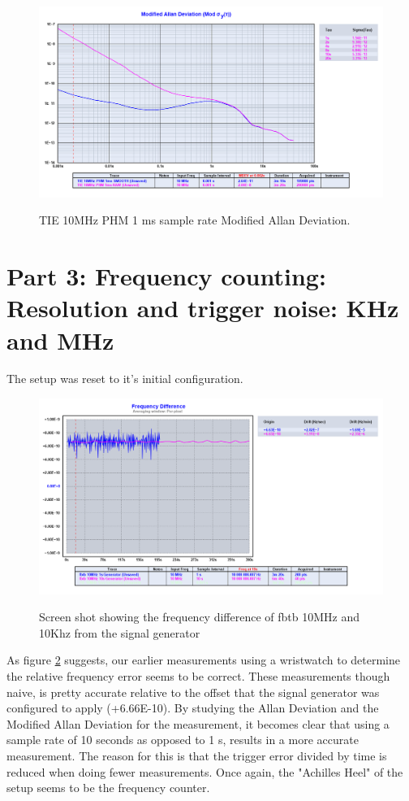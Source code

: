 \documentclass[11pt,english,a4paper]{article}
\begin{document}
\begin{figure}[!htb]
  \caption{TIE 10MHz PHM 1 ms sample rate Modified Allan Deviation.}
  \centering
    \includegraphics[width=1\textwidth]{tie_10mhz_phm_1ms_modified_allan.png}
    \label{fig:PHM_10MHz_mod_allan_dev}
\end{figure}

\newpage
\section{Part 3: Frequency counting: Resolution and trigger noise: KHz and MHz}
The setup was reset to it's initial configuration. 
\begin{figure}[!htb]
  \caption{Screen shot showing the frequency difference of fbtb 10MHz and 10Khz from the signal generator}
  \centering
    \includegraphics[width=1\textwidth]{freq_diff_del3.png}
    \label{fig:freq_diff_3}
\end{figure}
As figure \ref{fig:freq_diff_3} suggests, our earlier measurements using a wristwatch to determine the relative frequency error seems to be correct. These measurements though naive, is pretty accurate relative to the offset that the signal generator was configured to apply (+6.66E-10). By studying the Allan Deviation and the Modified Allan Deviation for the measurement, it becomes clear that using a sample rate of 10 seconds as opposed to 1 s, results in a more accurate measurement. The reason for this is that the trigger error divided by time is reduced when doing fewer measurements. Once again, the "Achilles Heel" of the setup seems to be the frequency counter. 
\end{document}

